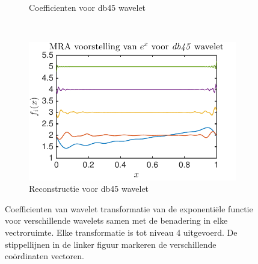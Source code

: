 \begin{figure}
\begin{subfigure}[b]{0.4\textwidth}
        \caption{Coefficienten voor db45 wavelet}
    \end{subfigure}
    ~ %
    \begin{subfigure}[b]{0.4\textwidth}
        \includegraphics[width=\textwidth]{../src/denoising/db45_noNoise/MRA_exp_db45_4}
        \caption{Reconstructie voor db45 wavelet}
    \end{subfigure}
    \caption{Coefficienten van wavelet transformatie van de exponenti\"ele functie voor verschillende wavelets samen met de benadering in elke vectroruimte. Elke transformatie is tot niveau 4 uitgevoerd. De stippellijnen in de linker figuur markeren de verschillende co\"ordinaten vectoren.}\label{fig:exp_noNoise}
\end{figure}



